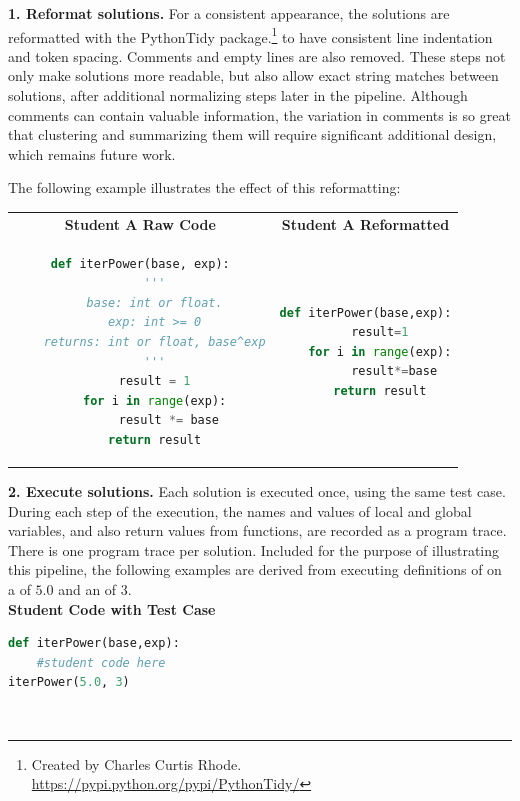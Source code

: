 {\bf 1. Reformat solutions.} For a consistent appearance, the solutions are reformatted with the PythonTidy package.\footnote{Created by Charles Curtis Rhode. \url{https://pypi.python.org/pypi/PythonTidy/}} to have consistent line indentation and token spacing. Comments and empty lines are also removed. These steps not only make solutions more readable, but also allow exact string matches between solutions, after additional normalizing steps later in the pipeline. Although comments can contain valuable information, the variation in comments is so great that clustering and summarizing them will require significant additional design, which remains future work.

The following example illustrates the effect of this reformatting:

\begin{tabular}{cc}
{\bf Student A Raw Code} & {\bf Student A Reformatted} \\
\begin{minipage}{0.5\linewidth}
\begin{lstlisting}[language=python]
def iterPower(base, exp):
    '''
    base: int or float.
    exp: int >= 0
    returns: int or float, base^exp
    '''
    result = 1
    for i in range(exp):
        result *= base
    return result
\end{lstlisting}
\end{minipage}
&
\begin{minipage}{0.5\linewidth}
\begin{lstlisting}[language=python]
def iterPower(base,exp):
    result=1
    for i in range(exp):
        result*=base
    return result
\end{lstlisting}
\end{minipage}
\end{tabular}



{\bf 2. Execute solutions.} Each solution is executed once, using the same test case. During each step of the execution, the names and values of local and global variables, and also return values from functions, are recorded as a program trace. There is one program trace per solution. Included for the purpose of illustrating this pipeline, the following examples are derived from executing definitions of  on a  of $5.0$ and an  of $3$. \\

{\bf Student Code with Test Case} \\
\begin{minipage}{0.5\linewidth}
\begin{lstlisting}[language=python]
def iterPower(base,exp):
    #student code here
iterPower(5.0, 3)
\end{lstlisting}
\end{minipage} \\




